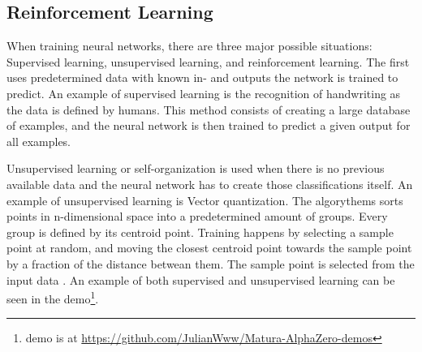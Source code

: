 \documentclass[12pt]{article}
\begin{document}
\subsection{Reinforcement Learning}
When training neural networks, there are three major possible situations: Supervised learning, unsupervised learning, and reinforcement learning. The first uses predetermined data with known in- and outputs the network is trained to predict. An example of supervised learning is the recognition of handwriting as the data is defined by humans. This method consists of creating a large database of examples, and the neural network is then trained to predict a given output for all examples. 

Unsupervised learning or self-organization is used when there is no previous available data and the neural network has to create those classifications itself. An example of unsupervised learning is Vector quantization. The algorythems sorts points in n-dimensional space into a predetermined amount of groups. Every group is defined by its centroid point. Training happens by selecting a sample point at random, and moving the closest centroid point towards the sample point by a fraction of the distance betwean them. The sample point is selected from the input data \cite{wiki:Vector_quantization}. An example of both supervised and unsupervised learning can be seen in the demo\footnote{demo is at \url{https://github.com/JulianWww/Matura-AlphaZero-demos}}.
\end{document}
